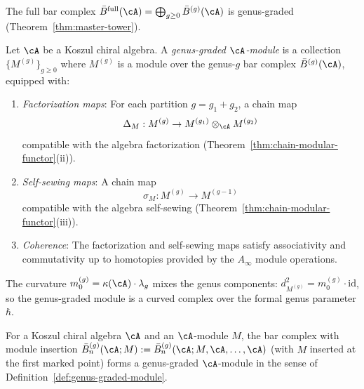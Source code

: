 The full bar complex $\bar{B}^{\mathrm{full}}(\cA) = \bigoplus_{g \geq 0}
\bar{B}^{(g)}(\cA)$ is genus-graded (Theorem~\ref{thm:master-tower}).

\begin{definition}\label{def:genus-graded-module}
Let $\cA$ be a Koszul chiral algebra.  A \emph{genus-graded
$\cA$-module} is a collection $\{M^{(g)}\}_{g \geq 0}$ where
$M^{(g)}$ is a module over the genus-$g$ bar complex
$\bar{B}^{(g)}(\cA)$, equipped with:
\begin{enumerate}[label=\textup{(\roman*)}]
\item \emph{Factorization maps}: For each partition $g = g_1 + g_2$,
  a chain map
  \begin{equation}\label{eq:module-factorization}
  \Delta_M: M^{(g)} \to M^{(g_1)} \otimes_{\cA} M^{(g_2)}
  \end{equation}
  compatible with the algebra factorization
  (Theorem~\ref{thm:chain-modular-functor}(ii)).
\item \emph{Self-sewing maps}: A chain map
  \begin{equation}\label{eq:module-self-sewing}
  \sigma_M: M^{(g)} \to M^{(g-1)}
  \end{equation}
  compatible with the algebra self-sewing
  (Theorem~\ref{thm:chain-modular-functor}(iii)).
\item \emph{Coherence}: The factorization and self-sewing maps
  satisfy associativity and commutativity up to homotopies
  provided by the $A_\infty$ module operations.
\end{enumerate}

The curvature $m_0^{(g)} = \kappa(\cA) \cdot \lambda_g$ mixes
the genus components: $d_{M^{(g)}}^2 = m_0^{(g)} \cdot \mathrm{id}$,
so the genus-graded module is a curved complex over the formal
genus parameter $\hbar$.
\end{definition}

\begin{theorem}\label{thm:module-genus-tower}
For a Koszul chiral algebra $\cA$ and an $\cA$-module $M$, the
bar complex with module insertion
$\bar{B}^{(g)}_n(\cA; M) :=
\bar{B}^{(g)}_n(\cA; M, \cA, \ldots, \cA)$
\textup{(}with $M$ inserted at the first marked
point\textup{)} forms a genus-graded $\cA$-module in the sense
of Definition~\textup{\ref{def:genus-graded-module}}.
\end{theorem}

